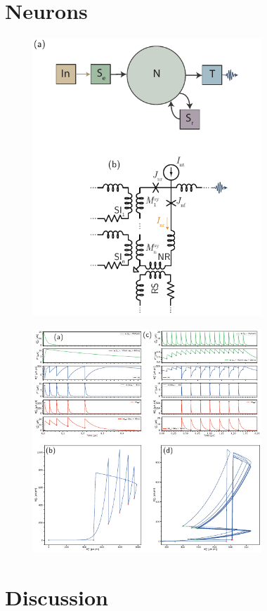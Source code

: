 \documentclass[twocolumn]{article}
\begin{document}
\section{\label{sec:neurons}Neurons}

\begin{figure}[h!]
\includegraphics[width=8.6cm]{figures/_fig__point_neuron__schematic__circuit.pdf}
\end{figure}

\begin{figure}[h!]
\includegraphics[width=8.6cm]{figures/_fig__point_neuron__one_synapse.pdf}
\end{figure}

\section{\label{sec:discussion}Discussion}





\end{document}
